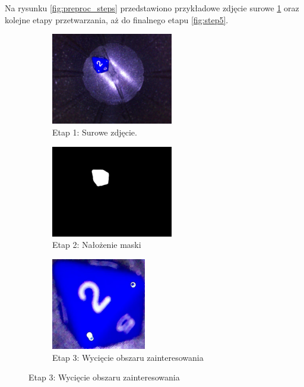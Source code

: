 Na rysunku \ref{fig:preproc_steps} przedstawiono przykładowe zdjęcie surowe \ref{fig:step1}
oraz kolejne etapy przetwarzania, aż do finalnego etapu \ref{fig:step5}.

\begin{figure}[H]
    \centering
    \begin{subfigure}[t]{0.32\linewidth}
        \centering
        \includegraphics[height=4cm]{chapters/04-czytanie/figures/2_1.jpg}
        \caption{Etap 1: Surowe zdjęcie.}
        \label{fig:step1}
    \end{subfigure}
    \hfill
    \begin{subfigure}[t]{0.32\linewidth}
        \centering
        \includegraphics[height=4cm]{chapters/04-czytanie/figures/2_2.jpg}
        \caption{Etap 2: Nałożenie maski}
        \label{fig:step2}
    \end{subfigure}
    \hfill
    \begin{subfigure}[t]{0.32\linewidth}
        \centering
        \includegraphics[height=4cm]{chapters/04-czytanie/figures/2_3.jpg}
        \caption{Etap 3: Wycięcie obszaru zainteresowania}
        \label{fig:step3}
    \end{subfigure}

    \vspace{0.5cm}


\end{figure}
